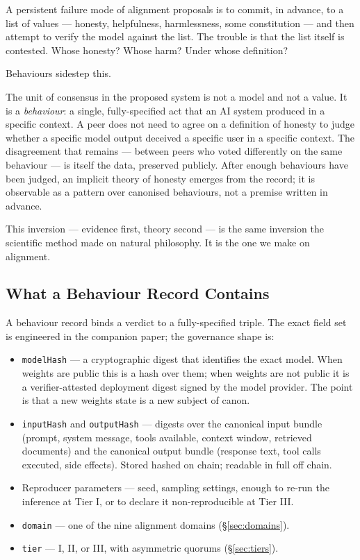 \documentclass[11pt,a4paper]{article}
\begin{document}
A persistent failure mode of alignment proposals is to commit, in
advance, to a list of values --- honesty, helpfulness,
harmlessness, some constitution --- and then attempt to verify
the model against the list. The trouble is that the list itself
is contested. Whose honesty? Whose harm? Under whose definition?

Behaviours sidestep this.

The unit of consensus in the proposed system is not a model and
not a value. It is a \emph{behaviour}: a single, fully-specified
act that an AI system produced in a specific context. A peer
does not need to agree on a definition of honesty to judge
whether a specific model output deceived a specific user in a
specific context. The disagreement that remains --- between
peers who voted differently on the same behaviour --- is itself
the data, preserved publicly. After enough behaviours have been
judged, an implicit theory of honesty emerges from the record;
it is observable as a pattern over canonised behaviours, not a
premise written in advance.

This inversion --- evidence first, theory second --- is the same
inversion the scientific method made on natural philosophy. It
is the one we make on alignment.

\subsection{What a Behaviour Record Contains}

A behaviour record binds a verdict to a fully-specified triple.
The exact field set is engineered in the companion paper; the
governance shape is:

\begin{itemize}[leftmargin=1.5em]
  \item \texttt{modelHash} --- a cryptographic digest that
        identifies the exact model. When weights are public this
        is a hash over them; when weights are not public it is a
        verifier-attested deployment digest signed by the model
        provider. The point is that a new weights state is a new
        subject of canon.
  \item \texttt{inputHash} and \texttt{outputHash} --- digests
        over the canonical input bundle (prompt, system message,
        tools available, context window, retrieved documents)
        and the canonical output bundle (response text, tool
        calls executed, side effects). Stored hashed on chain;
        readable in full off chain.
  \item Reproducer parameters --- seed, sampling settings,
        enough to re-run the inference at Tier I, or to declare
        it non-reproducible at Tier III.
  \item \texttt{domain} --- one of the nine alignment domains
        (\S\ref{sec:domains}).
  \item \texttt{tier} --- I, II, or III, with asymmetric quorums
        (\S\ref{sec:tiers}).
\end{itemize}
\end{document}

